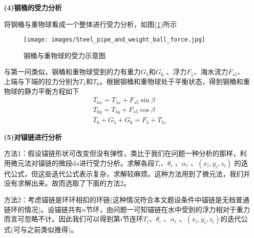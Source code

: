             \par
            \textbf{(4)钢桶的受力分析}
            \par
            将钢桶与重物球看成一个整体进行受力分析，如图(\ref{钢桶与重物球的受力示意图})所示
            \begin{figure}[H]
            \centering
            \texttt{[image: images/Steel\_pipe\_and\_weight\_ball\_force.jpg]}
            \caption{钢桶与重物球的受力示意图}
            \label{钢桶与重物球的受力示意图}
            \end{figure}
            \par
            与第一问类似，钢桶和重物球受到的力有重力$G_5$和$G_6$ 、浮力$F_5$、海水流力$F_{s5}$、上端与下端的拉力分别为$T_5$和$T_6$。根据钢桶和重物球处于平衡状态，得到钢桶和重物球的静力平衡方程如下
            \begin{align*}
            & T_{6x} = T_{5x}+F_{s5}\sin \beta\\
            & T_{6y} = T_{5y}+F_{s5}\cos \beta\\
            & T_6 + G_5+G_6 = F_5+T_{5z}
            \end{align*}
            \par
            \textbf{(5)对锚链进行分析}
            \par
            方法1：假设锚链形状可改变但没有弹性，类比于我们在问题一种分析的那样，利用微元法对锚链的微段$\mathrm{d}s$进行受力分析。求解各段$T_i$、$\theta_i$ 、$\alpha_i$ 、$(x_i,y_i,z_i)$ 的迭代公式，但这些迭代公式表示复杂，求解较麻烦。这种方法用到了微元法，我们并没有求解出来。故而选取了下面的方法2。
            \par
            方法2：考虑锚链是环环相扣的环链(这种情况符合本文题设条件中锚链是无档普通链环的情况)。设锚链共有$n$节环，由问题一可知锚链在水中受到的浮力相对于重力而言可忽略不计。因此我们可以得到第$i$节连环$T_i$、$\theta_i$ 、$\alpha_i$ 、$(x_i,y_i,z_i)$的迭代公式(可与之前类似推得)。
